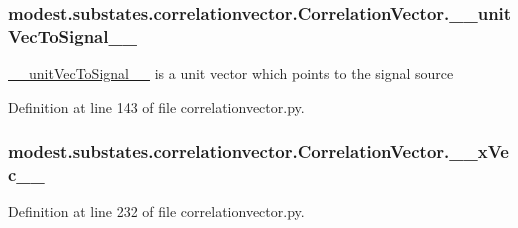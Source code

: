 \subsubsection[{\texorpdfstring{\+\_\+\+\_\+unit\+Vec\+To\+Signal\+\_\+\+\_\+}{__unitVecToSignal__}}]{\setlength{\rightskip}{0pt plus 5cm}modest.\+substates.\+correlationvector.\+Correlation\+Vector.\+\_\+\+\_\+unit\+Vec\+To\+Signal\+\_\+\+\_\+\hspace{0.3cm}{\ttfamily [private]}}\hypertarget{classmodest_1_1substates_1_1correlationvector_1_1CorrelationVector_a4a6aacd90c573941e4f097a034bdb76c}{}\label{classmodest_1_1substates_1_1correlationvector_1_1CorrelationVector_a4a6aacd90c573941e4f097a034bdb76c}


\hyperlink{classmodest_1_1substates_1_1correlationvector_1_1CorrelationVector_a4a6aacd90c573941e4f097a034bdb76c}{\+\_\+\+\_\+unit\+Vec\+To\+Signal\+\_\+\+\_\+} is a unit vector which points to the signal source 



Definition at line 143 of file correlationvector.\+py.

\subsubsection[{\texorpdfstring{\+\_\+\+\_\+x\+Vec\+\_\+\+\_\+}{__xVec__}}]{\setlength{\rightskip}{0pt plus 5cm}modest.\+substates.\+correlationvector.\+Correlation\+Vector.\+\_\+\+\_\+x\+Vec\+\_\+\+\_\+\hspace{0.3cm}{\ttfamily [private]}}\hypertarget{classmodest_1_1substates_1_1correlationvector_1_1CorrelationVector_aadd6c074ce0e9cdc557a240e6a82230e}{}\label{classmodest_1_1substates_1_1correlationvector_1_1CorrelationVector_aadd6c074ce0e9cdc557a240e6a82230e}


Definition at line 232 of file correlationvector.\+py.

